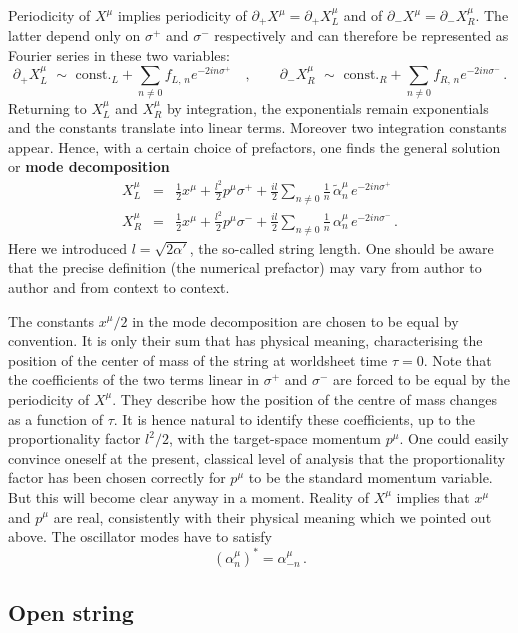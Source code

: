 \documentclass[12pt]{article}
\newcommand{\be}{\begin{equation}}
\newcommand{\ee}{\end{equation}}
\newcommand{\bea}{\begin{eqnarray}}
\newcommand{\eea}{\end{eqnarray}}
\numberwithin{equation}{section}
\begin{document}
Periodicity of $X^\mu$ implies periodicity of $\partial_+ X^\mu=\partial_+ X^\mu_L$ and of $\partial_- X^\mu=\partial_- X^\mu_R$. The latter depend only on $\sigma^+$ and $\sigma^-$ respectively and can therefore be represented as Fourier series in these two variables:
\be
\partial_+X_L^\mu\,\,\sim\,\, \mbox{const.}_L+\sum_{n\neq 0} f_{L,\,n} e^{-2in\sigma^+}\quad,\qquad
\partial_-X_R^\mu\,\,\sim\,\, \mbox{const.}_R+\sum_{n\neq 0} f_{R,\,n} e^{-2in\sigma^-}\,.
\ee
Returning to $X^\mu_L$ and $X^\mu_R$ by integration, the exponentials remain exponentials and the constants translate into linear terms. Moreover two integration constants appear. Hence, with a certain choice of prefactors, one finds the general solution or {\bf mode decomposition}
\bea
X_L^\mu&=&\frac{1}{2}x^\mu+\frac{l^2}{2}p^\mu\sigma^+ +\frac{il}{2}\sum_{n\neq 0}\frac{1}{n}\,\tilde{\alpha}_n^\mu\,e^{-2in\sigma^+}
\\
X_R^\mu&=&\frac{1}{2}x^\mu+\frac{l^2}{2}p^\mu\sigma^- +\frac{il}{2}\sum_{n\neq 0}\frac{1}{n}\,\alpha_n^\mu\,e^{-2in\sigma^-}\,.
\eea
Here we introduced $l=\sqrt{2\alpha'}$, the so-called string length. One should be aware that the precise definition (the numerical prefactor) may vary from author to author and from context to context. 

The constants $x^\mu/2$ in the mode decomposition are chosen to be equal by convention. It is only their sum that has physical meaning, characterising the position of the center of mass of the string at worldsheet time $\tau=0$. Note that the coefficients of the two terms linear in $\sigma^+$ and $\sigma^-$ are forced to be equal by the periodicity of $X^\mu$. They describe how the position of the centre of mass changes as a function of $\tau$. It is hence natural to identify these coefficients, up to the proportionality factor $l^2/2$, with the target-space momentum $p^\mu$. One could easily convince oneself at the present, classical level of analysis that the proportionality factor has been chosen correctly for $p^\mu$ to be the standard momentum variable. But this will become clear anyway in a moment. Reality of $X^\mu$ implies that $x^\mu$ and $p^\mu$ are real, consistently with their physical meaning which we pointed out above. The oscillator modes have to satisfy
\be
(\alpha_n^\mu)^*=\alpha_{-n}^\mu\,.
\ee





\subsection{Open string}
\end{document}
